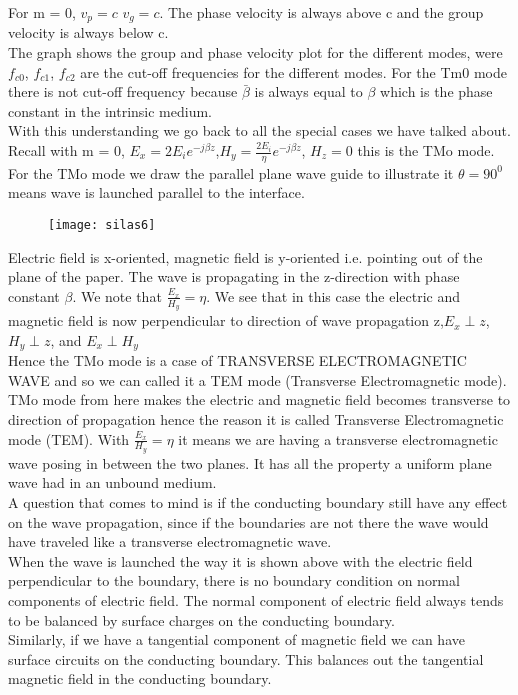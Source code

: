 For m = 0, $v_{p}=c$ $v_{g}=c$. The phase velocity is always above c and the group velocity is always below c.\\
The graph shows the group and phase velocity plot for the different modes, were $f_{c0}$, $f_{c1}$, $f_{c2}$ are the cut-off frequencies for the different modes. For the Tm0 mode there is not cut-off frequency because $\bar{\beta}$ is always equal to $\beta$ which is the phase constant in the intrinsic medium.\\
With this understanding we go back to all the special cases we have talked about. Recall with m = 0, $E_{x} =2E_{i} e^{-j\beta z}$,$H_{y} = \frac{2E_{i}}{\eta} e^{-j\beta z}$, $H_{z} =0$ this is the TMo mode.\\
For the TMo mode we draw the parallel plane wave guide to illustrate it $\theta =90^{0}$ means wave is launched parallel to the interface.\\
\begin{figure}[h]
	\centering
	\texttt{[image: silas6]}
	\caption{}
\end{figure}
Electric field is x-oriented, magnetic field is y-oriented i.e. pointing out of the plane of the paper. The wave is propagating in the z-direction with phase constant $\beta$. We note that $\frac{E_{x}}{H_{y}} = \eta$. We see that in this case the electric and magnetic field is now perpendicular to direction of wave propagation z,$E_{x}\perp z$,$H_{y}\perp z$, and $E_{x}\perp H_{y}$\\
Hence the TMo mode is a case of TRANSVERSE ELECTROMAGNETIC WAVE and so we can called it a TEM mode (Transverse Electromagnetic mode). TMo mode from here makes the electric and magnetic field becomes transverse to direction of propagation hence the reason it is called Transverse Electromagnetic mode (TEM). With $\frac{E_{x}}{H_{y}} = \eta$ it means we are having a transverse electromagnetic wave posing in between the two planes. It has all the property a uniform plane wave had in an unbound medium.\\
A question that comes to mind is if the conducting boundary still have any effect on the wave propagation, since if the boundaries are not there the wave would have traveled like a transverse electromagnetic wave.\\
When the wave is launched the way it is shown above with the electric field perpendicular to the boundary, there is no boundary condition on normal components of electric field. The normal component of electric field always tends to be balanced by surface charges on the conducting boundary.\\ Similarly, if we have a tangential component of magnetic field we can have surface circuits on the conducting boundary. This balances out the tangential magnetic field in the conducting boundary.\\
